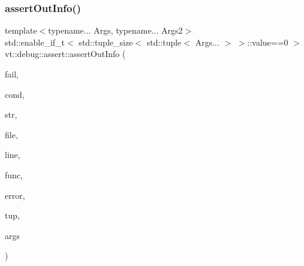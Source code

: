 \subsubsection{\texorpdfstring{assert\+Out\+Info()}{assertOutInfo()}\hspace{0.1cm}{\footnotesize\ttfamily [1/2]}}
{\footnotesize\ttfamily template$<$typename... Args, typename... Args2$>$ \\
std\+::enable\+\_\+if\+\_\+t$<$ std\+::tuple\+\_\+size$<$ std\+::tuple$<$ Args... $>$ $>$\+::value==0 $>$ vt\+::debug\+::assert\+::assert\+Out\+Info (\begin{DoxyParamCaption}\item[{bool}]{fail,  }\item[{std\+::string const}]{cond,  }\item[{std\+::string const \&}]{str,  }\item[{std\+::string const \&}]{file,  }\item[{int const}]{line,  }\item[{std\+::string const \&}]{func,  }\item[{\hyperlink{namespacevt_a793764d753923abc3d32929870beb485}{Error\+Code\+Type}}]{error,  }\item[{std\+::tuple$<$ Args2... $>$ \&\&}]{tup,  }\item[{std\+::tuple$<$ Args... $>$ \&\&}]{args }\end{DoxyParamCaption})\hspace{0.3cm}{\ttfamily [inline]}}

\mbox{\label{namespacevt_1_1debug_1_1assert_a4a74f966d45347110a86f76e821c3e7c}} 
